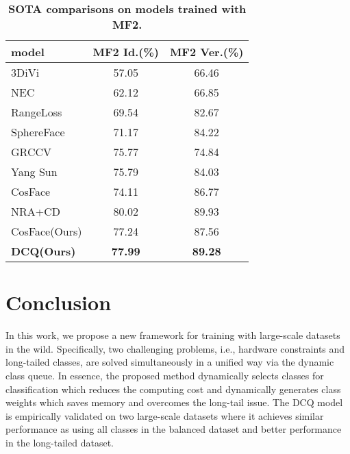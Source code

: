 \documentclass[10pt,twocolumn,letterpaper]{article}
\begin{document}
\begin{table}[h]
   \centering
   \footnotesize
   \caption{\textbf{SOTA comparisons on models trained with MF2.}\label{tab:sota-mf2}}
   \begin{tabular}{|l | c c|}
         \hline
         model & MF2 Id.(\%) &  MF2 Ver.(\%) \\
         \hline\hline
         3DiVi & 57.05 & 66.46 \\
         NEC & 62.12 & 66.85 \\
         RangeLoss & 69.54 & 82.67 \\
         SphereFace & 71.17 & 84.22 \\
         GRCCV & 75.77 & 74.84 \\
         Yang Sun & 75.79 & 84.03 \\
         CosFace\cite{wang2018cosface} & 74.11 & 86.77 \\
         NRA+CD\cite{zhong_unequal-training_2019} & 80.02 & 89.93 \\
         \hline\hline
         CosFace(Ours) & 77.24 & 87.56 \\
         \textbf{DCQ(Ours)} & \textbf{77.99} & \textbf{89.28} \\
         \hline
   \end{tabular}
\end{table}

\section{Conclusion}
In this work, we propose a new framework for training with large-scale datasets in the wild. Specifically, two challenging problems, i.e., hardware constraints and long-tailed classes, are solved simultaneously in a unified way via the dynamic class queue. In essence, the proposed method dynamically selects classes for classification which reduces the computing cost and dynamically generates class weights which saves memory and overcomes the long-tail issue. The DCQ model is empirically validated on two large-scale datasets where it achieves similar performance as using all classes in the balanced dataset and better performance in the long-tailed dataset.

{\small


}
\end{document}
